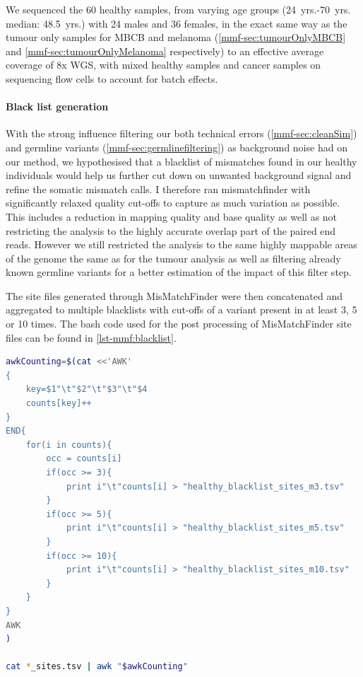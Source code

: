 We sequenced the 60 healthy samples, from varying age groups (\num{24}~yrs.-\num{70}~yrs. median: \num{48.5}~yrs.) with 24 males and 36 females, in the exact same way as the tumour only samples for MBCB and melanoma (\autoref{mmf-sec:tumourOnlyMBCB} and \autoref{mmf-sec:tumourOnlyMelanoma} respectively) to an effective average coverage of 8x WGS, with mixed healthy samples and cancer samples on sequencing flow cells to account for batch effects.


\cite{Ganuza2019}


\paragraph{Black list generation}
\label{mmf-sec:healthyBlacklist}
With the strong influence filtering our both technical errors (\autoref{mmf-sec:cleanSim}) and germline variants (\autoref{mmf-sec:germlinefiltering})  as background noise had on our method, we hypothesised that a blacklist of mismatches found in our healthy individuals would help us further cut down on unwanted background signal and refine the somatic mismatch calls. I therefore ran mismatchfinder with significantly relaxed quality cut-offs to capture as much variation as possible. This includes a reduction in mapping quality and base quality as well as not restricting the analysis to the highly accurate overlap part of the paired end reads. However we still restricted the analysis to the same highly mappable areas of the genome the same as for the tumour analysis as well as filtering already known germline variants for a better estimation of the impact of this filter step.

The site files generated through MisMatchFinder were then concatenated and aggregated to multiple blacklists with cut-offs of a variant present in at least 3, 5 or 10 times. The bash code used for the post processing of MisMatchFinder site files can be found in \autoref{lst-mmf:blacklist}.


\begin{lstlisting}[language=bash, caption=Blacklist postprocessing, label={lst-mmf:blacklist}]
awkCounting=$(cat <<'AWK'
{
    key=$1"\t"$2"\t"$3"\t"$4
    counts[key]++
}
END{
    for(i in counts){
        occ = counts[i]
        if(occ >= 3){
            print i"\t"counts[i] > "healthy_blacklist_sites_m3.tsv"
        }
        if(occ >= 5){
            print i"\t"counts[i] > "healthy_blacklist_sites_m5.tsv"
        }
        if(occ >= 10){
            print i"\t"counts[i] > "healthy_blacklist_sites_m10.tsv"
        }
    }
}
AWK
)

cat *_sites.tsv | awk "$awkCounting"
\end{lstlisting}




